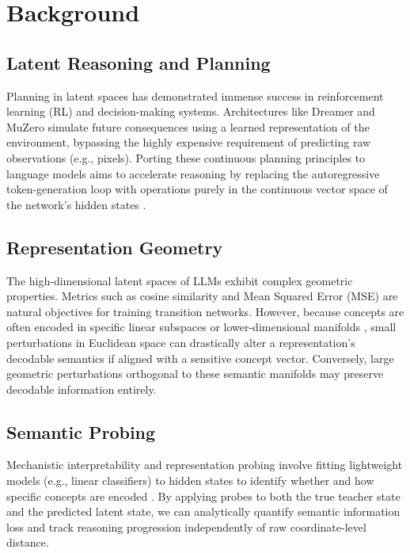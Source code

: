 \documentclass[conference]{IEEEtran}
\begin{document}
\section{Background}

\subsection{Latent Reasoning and Planning}
Planning in latent spaces has demonstrated immense success in reinforcement learning (RL) and decision-making systems. Architectures like Dreamer \cite{hafner2020dream} and MuZero \cite{schrittwieser2020mastering} simulate future consequences using a learned representation of the environment, bypassing the highly expensive requirement of predicting raw observations (e.g., pixels). Porting these continuous planning principles to language models aims to accelerate reasoning by replacing the autoregressive token-generation loop with operations purely in the continuous vector space of the network's hidden states \cite{belrose2023eliciting}.

\subsection{Representation Geometry}
The high-dimensional latent spaces of LLMs exhibit complex geometric properties. Metrics such as cosine similarity and Mean Squared Error (MSE) are natural objectives for training transition networks. However, because concepts are often encoded in specific linear subspaces or lower-dimensional manifolds \cite{alain2017understanding}, small perturbations in Euclidean space can drastically alter a representation's decodable semantics if aligned with a sensitive concept vector. Conversely, large geometric perturbations orthogonal to these semantic manifolds may preserve decodable information entirely.

\subsection{Semantic Probing}
Mechanistic interpretability and representation probing involve fitting lightweight models (e.g., linear classifiers) to hidden states to identify whether and how specific concepts are encoded \cite{nanda2022mechanistic}. By applying probes to both the true teacher state and the predicted latent state, we can analytically quantify semantic information loss and track reasoning progression independently of raw coordinate-level distance.
\end{document}
